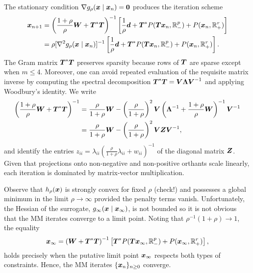 \documentclass{article}
\begin{document}
The stationary condition \(\nabla g_{\rho}(\boldsymbol{x} \mid \boldsymbol{x}_{n}) = {\bf 0}\) produces the iteration scheme
\begin{equation*}
  \begin{split}
    \boldsymbol{x}_{n+1}
    &=
    \left(
      \frac{1+\rho}{\rho} \boldsymbol{W} + \boldsymbol{T}^{\ast} \boldsymbol{T}
    \right)^{-1}
    \left[
      \frac{1}{\rho} \boldsymbol{d}
      +
      \boldsymbol{T}^{\ast} P(\boldsymbol{T} \boldsymbol{x}_{n}, \mathbb{R}_{-}^{p})
      +
      P(\boldsymbol{x}_{n}, \mathbb{R}_{+}^{r})
    \right] \\
    &=
    \rho [\nabla^{2} g_{\rho}(\boldsymbol{x} \mid \boldsymbol{x}_{n})]^{-1}
    \left[
      \frac{1}{\rho} \boldsymbol{d}
      +
      \boldsymbol{T}^{\ast} P(\boldsymbol{T} \boldsymbol{x}_{n}, \mathbb{R}_{-}^{p})
      +
      P(\boldsymbol{x}_{n}, \mathbb{R}_{+}^{r})
    \right].
  \end{split}
\end{equation*}
The Gram matrix \(\boldsymbol{T}^{\ast} \boldsymbol{T}\) preserves sparsity because rows of \(\boldsymbol{T}\) are sparse except when \(m \le 4\).
Moreover, one can avoid repeated evaluation of the requisite matrix inverse by computing the spectral decomposition \(\boldsymbol{T}^{\ast} \boldsymbol{T} = \boldsymbol{V} \boldsymbol{\Lambda} \boldsymbol{V}^{-1}\) and applying Woodbury's identity.
We write
\begin{equation}
  \label{eq:matrix-inverse}
  \begin{split}
    \left(
      \frac{1+\rho}{\rho} \boldsymbol{W} + \boldsymbol{T}^{\ast} \boldsymbol{T}
    \right)^{-1}
    &=
    \frac{\rho}{1+\rho} \boldsymbol{W}
    -
    \left(\frac{\rho}{1+\rho}\right)^{2} \boldsymbol{V} \left(
      \boldsymbol{\Lambda}^{-1} + \frac{1+\rho}{\rho} \boldsymbol{W}
    \right)^{-1} \boldsymbol{V}^{-1} \\
    &=
    \frac{\rho}{1+\rho} \boldsymbol{W}
    -
    \left(\frac{\rho}{1+\rho}\right)^{2} \boldsymbol{V} \boldsymbol{Z} \boldsymbol{V}^{-1},
  \end{split}
\end{equation}
and identify the entries \(z_{ii} = \lambda_{ii} (\frac{\rho}{1+\rho} \lambda_{ii} + w_{ii})^{-1}\) of the diagonal matrix \(\boldsymbol{Z}\).
Given that projections onto non-negative and non-positive orthants scale linearly, each iteration is dominated by matrix-vector multiplication.

Observe that \(h_{\rho}(\boldsymbol{x})\) is strongly convex for fixed \(\rho\) (check!) and possesses a global minimum in the limit \(\rho \to \infty\) provided the penalty terms vanish.
Unfortunately, the Hessian of the surrogate, \(g_{\infty}(\boldsymbol{x} \mid \boldsymbol{x}_{\infty})\), is not bounded so it is not obvious that the MM iterates converge to a limit point.
Noting that \(\rho^{-1}(1+\rho) \to 1\), the equality
\begin{equation*}
  \boldsymbol{x}_{\infty}
  =
  \left(
      \boldsymbol{W} + \boldsymbol{T}^{\ast} \boldsymbol{T}
    \right)^{-1}
    \left[
      \boldsymbol{T}^{\ast} P(\boldsymbol{T} \boldsymbol{x}_{\infty}, \mathbb{R}_{-}^{p})
      +
      P(\boldsymbol{x}_{\infty}, \mathbb{R}_{+}^{r})
    \right],
\end{equation*}
holds precisely when the putative limit point \(\boldsymbol{x}_{\infty}\) respects both types of constraints.
Hence, the MM iterates \(\{\boldsymbol{x}_{n}\}_{n \ge 0}\) converge.
\end{document}
